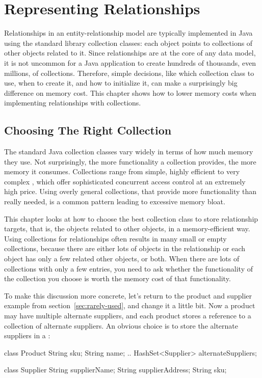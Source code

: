 \chapter{Representing Relationships}
\label{chapter:representing-relationships}

Relationships in an
entity-relationship model are typically implemented in Java using the
standard library collection classes:
each object points to collections of other objects related to it.
Since relationships are at the core of any data model, it
 is not uncommon for a Java application to create hundreds of
thousands, even millions, of collections. Therefore, simple decisions, like
which collection class to use, when to create it, and how to initialize it,
can make a surprisingly big difference on memory cost.
This chapter shows
 how to lower memory costs when implementing relationships with collections.
 
 \section{Choosing The Right Collection}

The standard Java collection classes vary widely in terms of how much memory they use.
Not surprisingly, the more functionality a collection provides, the more
memory it consumes. Collections range from simple, highly efficient
 to very complex
, which offer sophisticated concurrent access
control at an extremely high price. 
Using overly general collections, that provide more functionality than
really needed, is a common pattern leading to excessive memory bloat.

This chapter looks at how to choose the best collection class to
store relationship targets, that is, the objects related to other
objects, in a memory-efficient way. 
Using collections for relationships often results in many small or empty
collections, because there are either lots of objects in the relationship or
each object has only a few related other objects, or both. When there are lots
of collections with only a few entries, you need to ask  whether the
functionality of the collection you choose is worth the memory cost of that
functionality.

To make this discussion more concrete, let's return to the product and supplier example 
from section~\ref{sec:rarely-used}, and change it a little
 bit. Now a product may have multiple alternate suppliers, and each product
 stores a reference to a collection of alternate suppliers. An obvious choice is
 to store the alternate suppliers in a :
 \begin{shortlisting} 
class Product {
	String sku;
	String name;
	.. 
	HashSet<Supplier> alternateSuppliers;
}

class Supplier {
	String supplierName;
	String supplierAddress;
	String sku;
}
\end{shortlisting}
 

